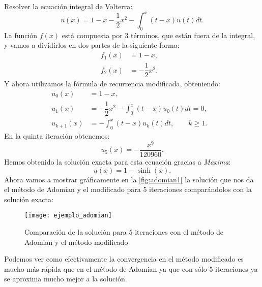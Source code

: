 \begin{ejemplo}
	Resolver la ecuación integral de Volterra:
	\begin{equation}
		u(x) = 1 -x-\dfrac{1}{2}x^2 - \int_{0}^{x}(t-x) u(t)dt.
	\end{equation}
	La función $f(x)$ está compuesta por 3 términos, que están fuera de la integral, y vamos a dividirlos en dos partes de la siguiente forma:
	\begin{align}
		f_1(x) &= 1 -x,      &   \\
		f_2(x) &=-\dfrac{1}{2}x^2.    &
	\end{align}
	Y ahora utilizamos la fórmula de recurrencia modificada, obteniendo:
	\begin{align}
		u_0(x) &=  1 -x,      &   \\
		u_{1}(x) &=-\dfrac{1}{2}x^2 - \int_{0}^{x}(t-x) u_0(t)dt = 0,    &  \\
		u_{k+1}(x) &= - \int_{0}^{x}(t-x) u_k(t)dt, \qquad k \geqslant 1.    &
	\end{align}
	En la quinta iteración obtenemos:
	\begin{equation}
		u_5(x)=-\dfrac{x^9}{120960}.
	\end{equation}
	Hemos obtenido la solución exacta para esta ecuación gracias a \textit{Maxima}:
	\begin{equation}
		u(x) = 1 - \sinh(x).
	\end{equation}
	Ahora vamos a mostrar gráficamente en la \autoref{fig:adomian1} la solución que nos da el método de Adomian y el modificado para 5 iteraciones comparándolos con la solución exacta:
	\begin{figure}[h!]
		\centering
		\texttt{[image: ejemplo\_adomian]}
		\caption{Comparación de la solución para 5 iteraciones con el método de Adomian y el método modificado}
		\label{fig:adomian1}
	\end{figure}
	\begin{observacion}
		Podemos ver como efectivamente la convergencia en el método modificado es mucho más rápida que en el método de Adomian ya que con sólo 5 iteraciones ya se aproxima mucho mejor a la solución.
\end{observacion}
\end{ejemplo}

